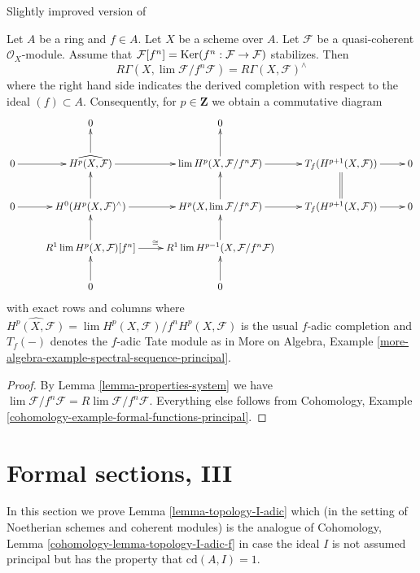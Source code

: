 \begin{lemma}
\label{lemma-formal-functions-principal}
\begin{reference}
Slightly improved version of \cite[Lemma 1.6]{Bhatt-local}
\end{reference}
Let $A$ be a ring and $f \in A$. Let $X$ be a scheme over $A$.
Let $\mathcal{F}$ be a quasi-coherent $\mathcal{O}_X$-module.
Assume that $\mathcal{F}[f^n] = \mathop{\mathrm{Ker}}(f^n : \mathcal{F} \to \mathcal{F})$
stabilizes. Then
$$
R\Gamma(X, \lim \mathcal{F}/f^n\mathcal{F}) =
R\Gamma(X, \mathcal{F})^\wedge
$$
where the right hand side indicates the derived completion
with respect to the ideal $(f) \subset A$. Consequently, for
$p \in \mathbf{Z}$ we obtain a commutative diagram
$$
\xymatrix{
& 0 & 0 \\
0 \ar[r] &
\widehat{H^p(X, \mathcal{F})} \ar[r] \ar[u] &
\lim H^p(X, \mathcal{F}/f^n\mathcal{F}) \ar[r] \ar[u] &
T_f(H^{p + 1}(X, \mathcal{F})) \ar[r] &
0 \\
0 \ar[r] &
H^0(H^p(X, \mathcal{F})^\wedge) \ar[r] \ar[u] &
H^p(X, \lim \mathcal{F}/f^n\mathcal{F}) \ar[r] \ar[u] &
T_f(H^{p + 1}(X, \mathcal{F})) \ar[r] \ar@{=}[u] &
0 \\
&
R^1\lim H^p(X, \mathcal{F})[f^n] \ar[u] \ar[r]^\cong &
R^1\lim H^{p - 1}(X, \mathcal{F}/f^n\mathcal{F}) \ar[u] \\
& 0 \ar[u] & 0 \ar[u]
}
$$
with exact rows and columns where
$\widehat{H^p(X, \mathcal{F})} =
\lim H^p(X, \mathcal{F})/f^n H^p(X, \mathcal{F})$
is the usual $f$-adic completion
and $T_f(-)$ denotes the $f$-adic Tate module as in
More on Algebra, Example
\ref{more-algebra-example-spectral-sequence-principal}.
\end{lemma}

\begin{proof}
By Lemma \ref{lemma-properties-system} we have
$\lim \mathcal{F}/f^n\mathcal{F} = R\lim \mathcal{F}/f^n \mathcal{F}$.
Everything else follows from Cohomology, Example
\ref{cohomology-example-formal-functions-principal}.
\end{proof}









\section{Formal sections, III}
\label{section-formal-sections-cd-one}

\noindent
In this section we prove Lemma \ref{lemma-topology-I-adic}
which (in the setting of Noetherian schemes and coherent modules)
is the analogue of Cohomology, Lemma \ref{cohomology-lemma-topology-I-adic-f}
in case the ideal $I$ is not assumed principal but
has the property that $\text{cd}(A, I) = 1$.

